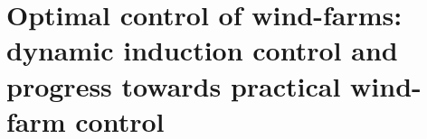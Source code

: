 \chapter{Optimal control of wind-farms: dynamic induction control and progress towards practical wind-farm control}\label{ch:methodology}


\cleardoublepage

